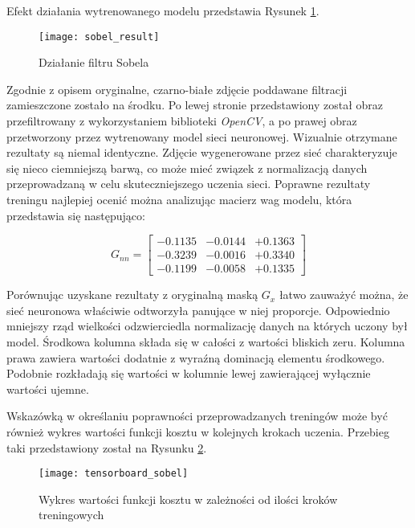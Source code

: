     Efekt działania wytrenowanego modelu przedstawia Rysunek \ref{fig:sobel_result}.

    \begin{figure}[H]
      \centering
      \texttt{[image: sobel\_result]}
      \caption[Działanie filtru Sobela - źródło: Praca własna]{Działanie filtru Sobela}
      \label{fig:sobel_result}
    \end{figure}

    Zgodnie z opisem oryginalne, czarno-białe zdjęcie poddawane filtracji zamieszczone
    zostało na środku. Po lewej stronie przedstawiony został obraz przefiltrowany
    z wykorzystaniem biblioteki \textit{OpenCV}, a po prawej obraz przetworzony przez
    wytrenowany model sieci neuronowej. Wizualnie otrzymane rezultaty są niemal
    identyczne. Zdjęcie wygenerowane przez sieć charakteryzuje się nieco ciemniejszą
    barwą, co może mieć związek z normalizacją danych przeprowadzaną w celu skuteczniejszego
    uczenia sieci. Poprawne rezultaty treningu najlepiej ocenić można analizując
    macierz wag modelu, która przedstawia się następująco:

    \[G_{nn} =
    \begin{bmatrix}
    -0.1135 & -0.0144 & +0.1363 \\
    -0.3239 & -0.0016 & +0.3340 \\
    -0.1199 & -0.0058 & +0.1335
    \end{bmatrix}
    \]

    Porównując uzyskane rezultaty z oryginalną maską $G_x$ łatwo zauważyć można,
    że sieć neuronowa właściwie odtworzyła panujące w niej proporcje. Odpowiednio
    mniejszy rząd wielkości odzwierciedla normalizację danych na których uczony
    był model. Środkowa kolumna składa się w całości z wartości bliskich zeru.
    Kolumna prawa zawiera wartości dodatnie z wyraźną dominacją elementu środkowego.
    Podobnie rozkładają się wartości w kolumnie lewej zawierającej wyłącznie wartości
    ujemne.

    Wskazówką w określaniu poprawności przeprowadzanych treningów może być również
    wykres wartości funkcji kosztu w kolejnych krokach uczenia. Przebieg taki
    przedstawiony został na Rysunku \ref{fig:tensorboard_sobel}.

    \begin{figure}[H]
      \centering
      \texttt{[image: tensorboard\_sobel]}
      \caption[Wykres wartości funkcji kosztu w zależności od ilości kroków treningowych - źródło: Praca własna]{Wykres wartości funkcji kosztu w zależności od ilości kroków treningowych}
      \label{fig:tensorboard_sobel}
    \end{figure}

